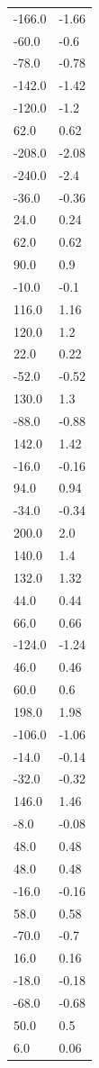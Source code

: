\begin{longtable}{ll}
-166.0 & -1.66 \\
-60.0 & -0.6 \\
-78.0 & -0.78 \\
-142.0 & -1.42 \\
-120.0 & -1.2 \\
62.0 & 0.62 \\
-208.0 & -2.08 \\
-240.0 & -2.4 \\
-36.0 & -0.36 \\
24.0 & 0.24 \\
62.0 & 0.62 \\
90.0 & 0.9 \\
-10.0 & -0.1 \\
116.0 & 1.16 \\
120.0 & 1.2 \\
22.0 & 0.22 \\
-52.0 & -0.52 \\
130.0 & 1.3 \\
-88.0 & -0.88 \\
142.0 & 1.42 \\
-16.0 & -0.16 \\
94.0 & 0.94 \\
-34.0 & -0.34 \\
200.0 & 2.0 \\
140.0 & 1.4 \\
132.0 & 1.32 \\
44.0 & 0.44 \\
66.0 & 0.66 \\
-124.0 & -1.24 \\
46.0 & 0.46 \\
60.0 & 0.6 \\
198.0 & 1.98 \\
-106.0 & -1.06 \\
-14.0 & -0.14 \\
-32.0 & -0.32 \\
146.0 & 1.46 \\
-8.0 & -0.08 \\
48.0 & 0.48 \\
48.0 & 0.48 \\
-16.0 & -0.16 \\
58.0 & 0.58 \\
-70.0 & -0.7 \\
16.0 & 0.16 \\
-18.0 & -0.18 \\
-68.0 & -0.68 \\
50.0 & 0.5 \\
6.0 & 0.06 \\

\end{longtable}
